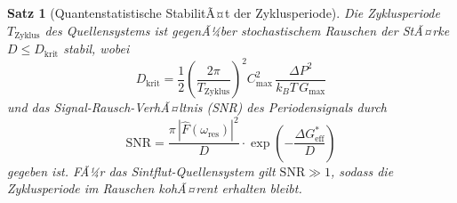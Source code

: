 ﻿\documentclass[12pt,a4paper]{report}
\newtheorem{theorem}{Satz}[chapter]
\begin{document}
\begin{theorem}[Quantenstatistische StabilitÃ¤t der Zyklusperiode]
	\label{thm:stochres}
	Die Zyklusperiode $T_\mathrm{Zyklus}$ des Quellensystems ist gegenÃ¼ber stochastischem Rauschen der StÃ¤rke $D \leq D_\mathrm{krit}$ stabil, wobei
	\begin{equation}
		D_\mathrm{krit} = \frac{1}{2}\left(\frac{2\pi}{T_\mathrm{Zyklus}}\right)^2 C_\mathrm{max}^2\,\frac{\Delta P^2}{k_BT\,G_\mathrm{max}}
		\label{eq:D_krit}
	\end{equation}
	und das Signal-Rausch-VerhÃ¤ltnis (SNR) des Periodensignals durch
	\begin{equation}
		\mathrm{SNR} = \frac{\pi\,|\hat{F}(\omega_\mathrm{res})|^2}{D} \cdot \exp\!\left(-\frac{\Delta G^*_\mathrm{eff}}{D}\right)
		\label{eq:snr}
	\end{equation}
	gegeben ist. FÃ¼r das Sintflut-Quellensystem gilt $\mathrm{SNR} \gg 1$, sodass die Zyklusperiode im Rauschen kohÃ¤rent erhalten bleibt.
\end{theorem}
\end{document}
